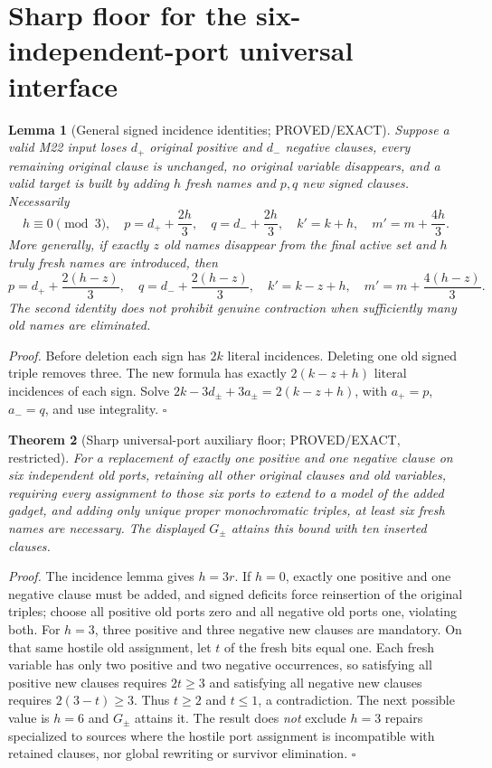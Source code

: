 \documentclass[11pt]{article}
\newtheorem{theorem}{Theorem}
\newtheorem{lemma}[theorem]{Lemma}
\begin{document}
\section{Sharp floor for the six-independent-port universal interface}
\begin{lemma}[General signed incidence identities; PROVED/EXACT]
Suppose a valid M22 input loses $d_+$ original positive and $d_-$ negative clauses, every remaining original clause is unchanged, no original variable disappears, and a valid target is built by adding $h$ fresh names and $p,q$ new signed clauses. Necessarily
\[
h\equiv0\pmod3,\quad
p=d_++\frac{2h}{3},\quad q=d_-+\frac{2h}{3},\quad
k'=k+h,\quad m'=m+\frac{4h}{3}.
\]
More generally, if exactly $z$ old names disappear from the final active set and $h$ truly fresh names are introduced, then
\[
p=d_++\frac{2(h-z)}3,\quad q=d_-+\frac{2(h-z)}3,
\quad k'=k-z+h,\quad m'=m+\frac{4(h-z)}3.
\]
The second identity does not prohibit genuine contraction when sufficiently many old names are eliminated.
\end{lemma}
\noindent\emph{Proof.} Before deletion each sign has $2k$ literal incidences. Deleting one old signed triple removes three. The new formula has exactly $2(k-z+h)$ literal incidences of each sign. Solve $2k-3d_\pm+3a_\pm=2(k-z+h)$, with $a_+=p$, $a_-=q$, and use integrality. \hfill$\square$

\begin{theorem}[Sharp universal-port auxiliary floor; PROVED/EXACT, restricted]
For a replacement of exactly one positive and one negative clause on six \emph{independent} old ports, retaining all other original clauses and old variables, requiring every assignment to those six ports to extend to a model of the added gadget, and adding only unique proper monochromatic triples, at least six fresh names are necessary. The displayed $G_\pm$ attains this bound with ten inserted clauses.
\end{theorem}
\noindent\emph{Proof.} The incidence lemma gives $h=3r$. If $h=0$, exactly one positive and one negative clause must be added, and signed deficits force reinsertion of the original triples; choose all positive old ports zero and all negative old ports one, violating both. For $h=3$, three positive and three negative new clauses are mandatory. On that same hostile old assignment, let $t$ of the fresh bits equal one. Each fresh variable has only two positive and two negative occurrences, so satisfying all positive new clauses requires $2t\ge3$ and satisfying all negative new clauses requires $2(3-t)\ge3$. Thus $t\ge2$ and $t\le1$, a contradiction. The next possible value is $h=6$ and $G_\pm$ attains it. The result does \emph{not} exclude $h=3$ repairs specialized to sources where the hostile port assignment is incompatible with retained clauses, nor global rewriting or survivor elimination. \hfill$\square$
\end{document}
